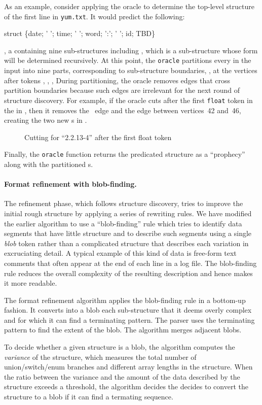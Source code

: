As an example, consider applying the oracle to determine the top-level
structure of the first line in \texttt{yum.txt}.  It would predict the
following: 
\begin{centercode}
struct \{date;  ' '; time; ' '; word; ':'; ' '; id; TBD\}
\end{centercode}
\ie{}, a  containing nine sub-structures including , which is
a sub-structure whose form will be determined recursively.
At this point, the {\tt oracle} partitions
every \seqset{} in the input into nine parts, corresponding to
sub-structure boundaries,
\ie{}, at the vertices after tokens , , ,
\etc{}
During partitioning, the oracle removes \seqset{} edges that cross partition
boundaries because such edges are irrelevant for the next round
of structure discovery.
For example, if the oracle cuts after the first {\tt float} token in the \seqset{}
in , then it removes the ~edge and the  edge between
vertices~42 and~46, creating the two new \seqset{}s in .
%
\begin{figure}[th]
\begin{center}
\end{center}
\caption{Cutting \seqset{} for ``2.2.13-4'' after the first float token} \label{fig:cut}
\end{figure}
%
Finally, the {\tt oracle} function returns the predicated structure as a ``prophecy''
along with the partitioned \seqset{}s. 

\paragraph*{Format refinement with blob-finding.}
The refinement phase, which follows structure discovery, tries to
improve the initial rough structure by applying a series of
rewriting rules.  We have modified the earlier algorithm to use a 
``blob-finding'' rule which tries to identify data segments that have
little structure and to describe such segments using a single
\textit{blob} token rather than a complicated structure that describes
each variation in excruciating detail.  A typical example of this kind
of data is free-form text comments that often appear at the end of
each line in a log file.  The blob-finding rule reduces the overall
complexity of the resulting description and hence makes it more
readable.

The format refinement algorithm applies the blob-finding rule 
in a bottom-up fashion. It converts into a blob each sub-structure
that it deems overly complex and for which it can find a terminating pattern. 
The \pads{} parser uses the terminating pattern to
find the extent of the blob. The algorithm merges adjacent blobs.

To decide whether a given structure is a blob, 
the algorithm computes the {\em variance} of the structure, which
measures the total number of union/switch/enum
branches and different array lengths in the 
structure. When the ratio between the variance and the amount of the data
described by the structure exceeds a threshold, the algorithm decides
the decides to convert the structure to a blob if it can find a
termating sequence.
